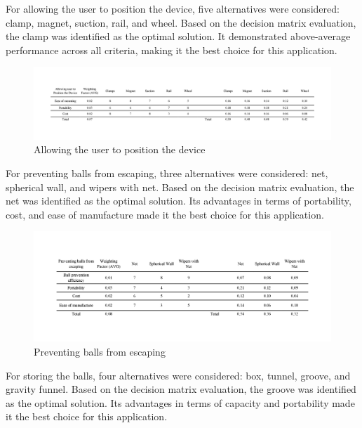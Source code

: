 \documentclass[12pt]{report}
\begin{document}
For allowing the user to position the device, five alternatives were considered: clamp, magnet, suction, rail, and wheel. Based on the decision matrix evaluation, the clamp was identified as the optimal solution. It demonstrated above-average performance across all criteria, making it the best choice for this application.

\begin{figure}[H]
    \centering
    \includegraphics[width=1\textwidth]{Decision matrices/position device.png}
    \caption{Allowing the user to position the device}
\end{figure}

For preventing balls from escaping, three alternatives were considered: net, spherical wall, and wipers with net. Based on the decision matrix evaluation, the net was identified as the optimal solution. Its advantages in terms of portability, cost, and ease of manufacture made it the best choice for this application.

\begin{figure}[H]
    \centering
    \includegraphics[width=1\textwidth]{Decision matrices/prevent escaping.png}
    \caption{Preventing balls from escaping}
\end{figure}

For storing the balls, four alternatives were considered: box, tunnel, groove, and gravity funnel. Based on the decision matrix evaluation, the groove was identified as the optimal solution. Its advantages in terms of capacity and portability made it the best choice for this application.
\end{document}
